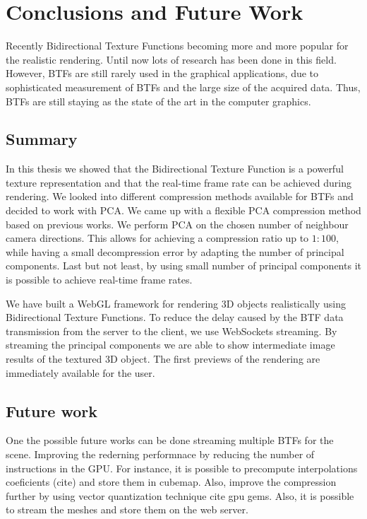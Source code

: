 \chapter{Conclusions and Future Work}
\label{chapter:conclusions}
Recently Bidirectional Texture Functions becoming more and more popular for the realistic rendering.
Until now lots of research has been done in this field. 
However, BTFs are still rarely used in the graphical applications, 
due to  sophisticated measurement of BTFs and the large size of the acquired data.
Thus, BTFs are still staying as the state of the art in the computer graphics. 


\section{Summary}
In this thesis we showed that the Bidirectional Texture Function is a powerful texture representation and 
that the real-time frame rate can be achieved during rendering.
We looked into different compression methods available for BTFs and decided to work with PCA.
We came up with a flexible PCA compression method based on previous works.
We perform PCA on the chosen number of neighbour camera directions.
This allows for achieving a compression ratio up to $1:100$, while having a small decompression error by adapting the number of principal components.
Last but not least, by using small number of principal components it is possible to achieve real-time frame rates.

We have built a WebGL framework for rendering 3D objects realistically using Bidirectional Texture Functions.
To reduce the delay caused by the BTF data transmission from the server to the client, we use WebSockets streaming.
By streaming the principal components we are able to show intermediate image results of the textured 3D object.
The first previews of the rendering are immediately available for the user.


\section{Future work}
\label{section:future_work}
One the possible future works can be done streaming multiple BTFs for the scene.
Improving the rederning performnace by reducing the number of instructions in the GPU.
For instance, it is possible to precompute interpolations coeficients (cite) and store them in cubemap.
Also, improve the compression further by using vector quantization technique cite gpu gems.
Also, it is possible to stream the meshes and store them on the web server.
